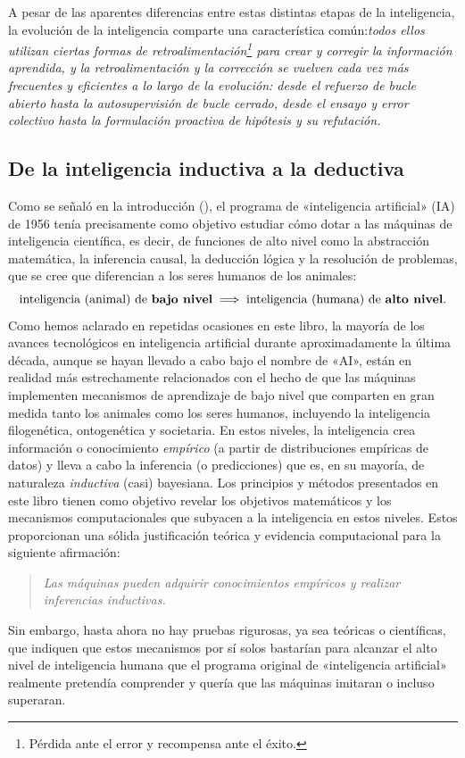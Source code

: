 \documentclass[../../book-main_es.tex]{subfiles}
\begin{document}
A pesar de las aparentes diferencias entre estas distintas etapas de
la inteligencia, la evolución de la inteligencia comparte una característica
común:\textit{todos ellos utilizan ciertas formas de
    retroalimentación\footnote{Pérdida ante el error y recompensa ante el éxito.} para crear
    y corregir la información aprendida, y la retroalimentación y la corrección se vuelven
    cada vez más frecuentes y eficientes a lo largo de la evolución: desde el refuerzo de bucle abierto hasta la autosupervisión de bucle cerrado, desde
el ensayo y error colectivo hasta la formulación proactiva de hipótesis y su refutación.}

\subsection{De la inteligencia inductiva a la deductiva}
Como se señaló en la introducción (), el programa de
«inteligencia artificial» (IA) de 1956 tenía precisamente como objetivo estudiar cómo
dotar a las máquinas de inteligencia científica, es decir, de funciones de alto nivel
como la abstracción matemática, la inferencia causal, la deducción lógica y 
la resolución de problemas, que se cree que diferencian a los seres humanos de los animales:
\begin{equation}
    \text{inteligencia (animal) de \textbf{bajo nivel}} \; \Longrightarrow \;
    \text{inteligencia (humana) de \textbf{alto nivel}.}
\end{equation}
Como hemos aclarado en repetidas ocasiones en este libro, la mayoría de los avances tecnológicos
en inteligencia artificial durante aproximadamente la última década, aunque
se hayan llevado a cabo bajo el nombre de «AI», están en realidad más estrechamente relacionados
con el hecho de que las máquinas implementen mecanismos de aprendizaje de bajo nivel que comparten en gran medida
tanto los animales como los seres humanos, incluyendo la inteligencia filogenética,
ontogenética y societaria. En estos niveles, la inteligencia
crea información o conocimiento \textit{empírico} (a partir de distribuciones empíricas de datos) y lleva a cabo la inferencia (o predicciones)
que es, en su mayoría, de naturaleza \textit{inductiva} (casi) bayesiana. Los principios y métodos presentados en este libro tienen como objetivo revelar los objetivos matemáticos y
los mecanismos computacionales que subyacen a la inteligencia en estos niveles. Estos
proporcionan una sólida justificación teórica y evidencia computacional
para la siguiente afirmación:
\begin{quote}
    \centering
    \textit{Las máquinas pueden adquirir conocimientos empíricos y realizar
    inferencias inductivas.}
\end{quote}
Sin embargo, hasta ahora no hay pruebas rigurosas, ya sea teóricas o científicas, 
que indiquen que estos mecanismos por sí solos bastarían para alcanzar
el alto nivel de inteligencia humana que el programa original de «inteligencia artificial» realmente
pretendía comprender y quería que las máquinas imitaran o incluso superaran.
\end{document}
